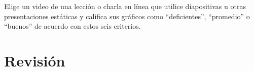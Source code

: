 Elige un video de una lección o charla en línea que utilice diapositivas u otras presentaciones estáticas
y califica sus gráficos como ``deficientes'', ``promedio'' o ``buenos'' de acuerdo con estos seis criterios.

\section*{Revisión}

